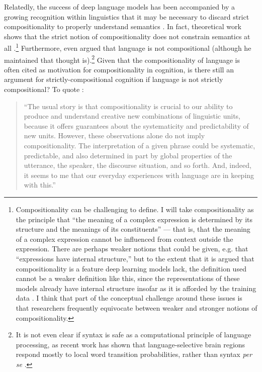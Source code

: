 Relatedly, the success of deep language models has been accompanied by a growing recognition within linguistics that it may be necessary to discard strict compositionality to properly understand semantics \citep{Goldberg2015,Potts2019}. In fact, theoretical work shows that the strict notion of compositionality does not constrain semantics at all \citep{Zadrozny1992}.\footnote{Compositionality can be challenging to define. I will take compositionality as the principle that ``the meaning of a complex expression is determined by its structure and the meanings of its constituents'' \citep{sep-compositionality} --- that is, that the meaning of a complex expression cannot be influenced from context outside the expression. There are perhaps weaker notions that could be given, e.g. that ``expressions have internal structure,'' but to the extent that it is argued that compositionality is a feature deep learning models lack, the definition used cannot be a weaker definition like this, since the representations of these models already have internal structure insofar as it is afforded by the training data \citep[e.g.][]{Mikolov2013}. I think that part of the conceptual challenge around these issues is that researchers frequently equivocate between weaker and stronger notions of compositionality.} Furthermore, even \citet{Fodor2001} argued that language is not compositional (although he maintained that thought is).\footnote{It is not even clear if syntax is safe as a computational principle of language processing, as recent work has shown that language-selective brain regions respond mostly to local word transition probabilities, rather than syntax \emph{per se} \citep{Mollica2020}.} Given that the compositionality of language is often cited as motivation for compositionality in cognition, is there still an argument for strictly-compositional cognition if language is not strictly compositional? To quote \citet{Potts2019}:
\begin{quote}
``The usual story is that compositionality is crucial to our ability to produce and understand creative new combinations of linguistic units, because it offers guarantees about the systematicity and predictability of new units. However, these observations alone do not imply compositionality. The interpretation of a given phrase could be systematic, predictable, and also determined in part by global properties of the utterance, the speaker, the discourse situation, and so forth. And, indeed, it seems to me that our everyday experiences with language are in keeping with this.''
\end{quote}
